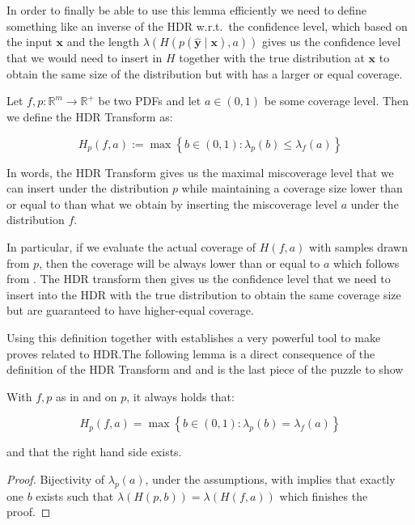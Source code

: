 In order to finally be able to use this lemma efficiently we need to define something like an inverse of the HDR w.r.t.\ the confidence level, which based on the input $\mathbf{x}$ and the length $\lambda(H(p(\hat{\mathbf{y}} \mid \mathbf{x}), a))$ gives us the confidence level that we would need to insert in $H$ together with the true distribution at $\mathbf{x}$ to obtain the same size of the distribution but with  has a larger or equal coverage.

\begin{definition}\label{def:hdr_transform}
    Let $f,p : \mathbb{R}^m \to \mathbb{R}^+$ be two PDFs and let $a \in (0,1)$ be some coverage level. Then we define the HDR Transform as:

    \begin{equation}
        H_p(f, a) := \max \left\{b \in (0,1):  \lambda_p(b) \leq \lambda_f(a)\right\}
    \end{equation}

\end{definition}
In words, the HDR Transform gives us the maximal miscoverage level that we can insert under the distribution $p$ while maintaining a coverage size lower than or equal to than what we obtain by inserting the miscoverage level $a$ under the distribution $f$.

In particular, if we evaluate the actual coverage of $H(f, a)$ with samples drawn from $p$, then the coverage will be always lower than or equal to $a$ which follows from . The HDR transform then gives us the confidence level that we need to insert into the HDR with the true distribution to obtain the same coverage size but are guaranteed to have higher-equal coverage.

Using this definition together with  establishes a very powerful tool to make proves related to HDR.\@ The following lemma is a direct consequence of the definition of the HDR Transform and  and is the last piece of the puzzle to show 

\begin{lemma}\label{lem:hdr_optimality}
    With $f,p$ as in  and  on $p$, it always holds that:

    \begin{equation}
        H_p(f, a) = \max \left\{b \in (0,1): \lambda_p(b) = \lambda_f(a)\right\}
    \end{equation}

    and that the right hand side exists.
\end{lemma}
\begin{proof}
    Bijectivity of $\lambda_p(a)$, under the assumptions, with  implies that exactly one $b$ exists such that $\lambda(H(p, b)) = \lambda(H(f, a))$ which finishes the proof.
\end{proof}

